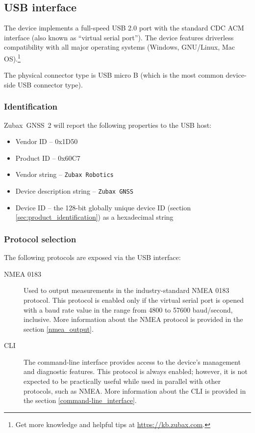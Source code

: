 \documentclass{zubaxdoc}
\begin{document}
\subsection{USB interface}

The device implements a full-speed USB 2.0 port with the standard CDC ACM interface
(also known as ``virtual serial port'').
The device features driverless compatibility with all major operating systems
(Windows, GNU/Linux, Mac OS).\footnote{Get more knowledge and helpful tips at \url{https://kb.zubax.com}.}

The physical connector type is USB micro B (which is the most common device-side USB connector type).

\subsubsection{Identification}

Zubax~GNSS~2 will report the following properties to the USB host:
\begin{itemize}
    \item Vendor ID -- 0x1D50
    \item Product ID -- 0x60C7
    \item Vendor string -- \verb|Zubax Robotics|
    \item Device description string -- \verb|Zubax GNSS|
    \item Device ID -- the 128-bit globally unique device ID (section \ref{sec:product_identification})
                       as a hexadecimal string
\end{itemize}

\subsubsection{Protocol selection}\label{sec:usb_protocol_selection}

The following protocols are exposed via the USB interface:
\begin{description}

    \item[NMEA 0183] Used to output measurements in the industry-standard NMEA 0183 protocol.
    This protocol is enabled only if the virtual serial port is opened with a baud rate value in the
    range from 4800 to 57600 baud/second, inclusive.
    More information about the NMEA protocol is provided in the section \ref{nmea_output}.

    \item[CLI] The command-line interface provides access to the device's management and diagnostic
    features. This protocol is always enabled; however, it is not expected to be practically useful
    while used in parallel with other protocols, such as NMEA.
    More information about the CLI is provided in the section \ref{command-line_interface}.

\end{description}
\end{document}
